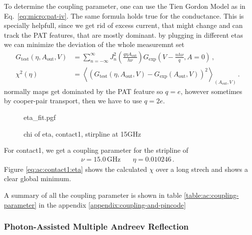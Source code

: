         To determine the coupling parameter, one can use the Tien Gordon Model as in Eq.~\eqref{eq:micro:pat-iv}. The same formula holds true for the conductance. This is specially helpfull, since we get rid of excess current, that might change and can track the PAT features, that are mostly dominant. by plugging in different etas we can minimize the deviation of the whole measuremnt set
        \begin{align}
            G_\mathrm{test}\!\left(\eta, A_\mathrm{out}, V\right) 
            &= \sum_{n=-\infty}^{\infty}
                        J_n^2\!\left(\frac{q\eta A_\mathrm{out}}{h\nu}\right)
                        G_\mathrm{exp}\!\left(V - \frac{n h\nu}{q}, A=0\right)\,,
            \label{eq:ac:photon-assisted-transport:coupling:dG}\\
            \chi^2\!(\eta) &= \left\langle\left(G_\mathrm{test}\!(\eta, A_\mathrm{out}, V)-G_\mathrm{exp}\!(A_\mathrm{out}, V)\right)^2\right\rangle_{(A_\mathrm{out}, V)}\,.
            \label{eq:ac:photon-assisted-transport:coupling:chi}
        \end{align}
        normally maps get dominated by the PAT feature so $q=e$, however sometimes by cooper-pair transport, then we have to use $q=2e$.

        \begin{figure}
            \captionsetup{format=plain}%
            \centering
            \vspace{-0.5em}
            {eta_fit.pgf}
            \caption{
                    chi of eta, contact1, stirpline at 15GHz
                }
            \label{fig:ac:contact1:eta}
        \end{figure}
        For contact1, we get a coupling parameter for the stripline of 
        \begin{align}
            \nu = 15.0\,\mathrm{GHz}\, &&
            \eta = 0.010246\,.
            \label{eq:ac:contact1:eta}
        \end{align}
        Figure \ref{eq:ac:contact1:eta} shows the calculated $\chi$ over a long strech and shows a clear global minimum.

        A summary of all the coupling parameter is shown in table \ref{table:ac:coupling-parameter} in the appendix \ref{appendix:coupling-and-pincode}

    \subsubsection*{Photon-Assisted Multiple Andreev Reflection}

